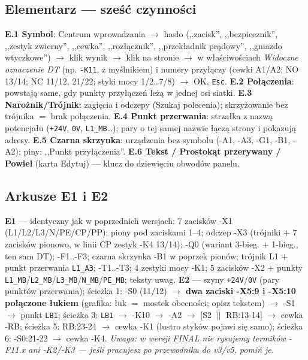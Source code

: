 \documentclass[11pt,a4paper]{article}
\begin{document}
\subsection{Elementarz --- sześć czynności}
\textbf{E.1 Symbol}: Centrum wprowadzania $\to$ hasło (,,zacisk'', ,,bezpiecznik'', ,,zestyk
zwierny'', ,,cewka'', ,,rozłącznik'', ,,przekładnik prądowy'', ,,gniazdo wtyczkowe'') $\to$ klik
wynik $\to$ klik na stronie $\to$ w właściwościach \emph{Widoczne oznaczenie DT} (np. \texttt{-K11},
z myślnikiem) i numery przyłączy (cewki A1/A2; NO 13/14; NC 11/12, 21/22; styki mocy 1/2\ldots7/8)
$\to$ OK, \texttt{Esc}. \textbf{E.2 Połączenia}: powstają same, gdy punkty przyłączeń leżą w jednej
osi siatki. \textbf{E.3 Narożnik/Trójnik}: zagięcia i odczepy (Szukaj polecenia); skrzyżowanie bez
trójnika $=$ brak połączenia. \textbf{E.4 Punkt przerwania}: strzałka z nazwą potencjału
(\texttt{+24V}, \texttt{0V}, \texttt{L1\_MB}\ldots); pary o tej samej nazwie łączą strony
i pokazują adresy. \textbf{E.5 Czarna skrzynka}: urządzenia bez symbolu (-A1, -A3, -G1, -B1, -A2);
piny: ,,Punkt przyłączenia''. \textbf{E.6 Tekst / Prostokąt przerywany / Powiel} (karta Edytuj)
--- klucz do dziewięciu obwodów panelu.

\subsection{Arkusze E1 i E2}
\textbf{E1} --- identyczny jak w poprzednich wersjach: 7 zacisków -X1 (L1/L2/L3/N/PE/CP/PP);
piony pod zaciskami 1--4; odczep -X3 (trójniki $+$ 7 zacisków pionowo, w linii CP zestyk -K4
13/14); -Q0 (wariant 3-bieg. $+$ 1-bieg., ten sam DT); -F1..-F3; czarna skrzynka -B1 w poprzek
pionów; trójnik L1 $+$ punkt przerwania \texttt{L1\_A3}; -T1..-T3; 4 zestyki mocy -K1; 5 zacisków
-X2 $+$ punkty \texttt{L1\_MB}/\texttt{L2\_MB}/\texttt{L3\_MB}/\texttt{N\_MB}/\texttt{PE\_MB};
teksty uwag. \textbf{E2} --- szyny \texttt{+24V}/\texttt{0V} (pary punktów przerwania); ścieżka 1:
-S0 (11/12) $\to$ \textbf{dwa zaciski -X5:9 i -X5:10 połączone łukiem} (grafika: łuk $=$ mostek
obecności; opisz tekstem) $\to$ -S1 $\to$ punkt \texttt{LB1}; ścieżka 3: \texttt{LB1} $\to$ -K10
$\to$ -A2 $\to$ [S2 $\parallel$ RB:13-14] $\to$ cewka -RB; ścieżka 5: RB:23-24 $\to$ cewka -K1
(lustro styków pojawi się samo); ścieżka 6: -S0:21-22 $\to$ cewka -K4. \emph{Uwaga: w wersji FINAL
nie rysujemy termików -F11.x ani -K2/-K3 --- jeśli pracujesz po przewodniku do v3/v5, pomiń je.}
\end{document}
